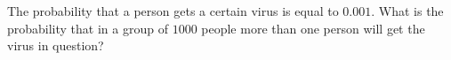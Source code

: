 The probability that a person gets a certain virus is equal to $0.001$.
What is the probability that in a group of $1000$ people more than one person will get the virus in question?